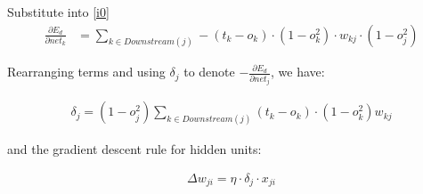 \documentclass[preview]{standalone}
\begin{document}
Substitute into \cref{i0}
\begin{align}
\label{i4}
\frac{\partial E_d}{\partial net_{{k}}}
&= \sum_{{k\in Downstream(j)}}-(t_{{k}}-o_{{k}})\cdot(1-o_{{k}}^2)\cdot
w_{{kj}} \cdot(1-o_j^2)
\end{align}

Rearranging terms and using $\delta_j$ to denote $-\frac{\partial E_d}{\partial
net_j}$, we have:

\begin{align}
    \delta_j = (1-o_j^2)\sum_{{k\in
    Downstream(j)}}(t_{{k}}-o_{{k}})\cdot(1-o_{{k}}^2)w_{{kj}}
\end{align}

and the gradient descent rule for hidden units:

\begin{align}
    \Delta w_{ji} = \eta \cdot \delta_j \cdot x_{ji}
\end{align}
\end{document}
